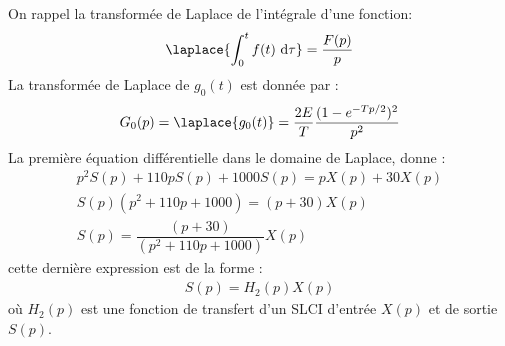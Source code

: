 On rappel la transformée de Laplace de l'intégrale d'une fonction:
\[
\laplace{\int_{0}^{t}f(t)\,\,\mathrm{d}\tau}=\dfrac{F(p)}{p}
\]
La transformée de Laplace de $g_0(t)$ est donnée par :
\[
G_0(p) = \laplace{g_0(t)}=\dfrac{2E}{T}\dfrac{(1-e^{-Tp/2})^2}{p^2}
\]
\question{}
La première équation différentielle dans le domaine de Laplace, donne : 
\begin{align*}
    p^2S(p)+110pS(p)+1000S(p)=pX(p)+30X(p) \\
    S(p) ( p^2+110p+1000) = (p+30)X(p) \\
    S(p) = \dfrac{(p+30)}{(p^2+110p+1000)} X(p) 
\end{align*}
cette dernière expression est de la forme :
\begin{align}
    S(p) = H_2(p) X(p)
    \label{eq-h2}
\end{align}
où $H_2(p)$ est une fonction de transfert d'un SLCI d'entrée $X(p)$ 
et de sortie $S(p)$.
\begin{center}
\end{center}
